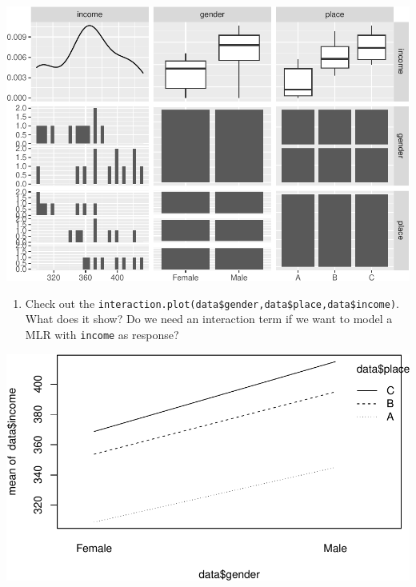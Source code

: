 \documentclass[
]{article}
\newenvironment{Shaded}{\begin{snugshade}}{\end{snugshade}}
\newcommand{\AttributeTok}[1]{\textcolor[rgb]{0.13,0.29,0.53}{#1}}
\newcommand{\FunctionTok}[1]{\textcolor[rgb]{0.13,0.29,0.53}{\textbf{#1}}}
\newcommand{\NormalTok}[1]{#1}
\newcommand{\SpecialCharTok}[1]{\textcolor[rgb]{0.81,0.36,0.00}{\textbf{#1}}}
\newcommand{\StringTok}[1]{\textcolor[rgb]{0.31,0.60,0.02}{#1}}
\providecommand{\tightlist}{%
  \setlength{\itemsep}{0pt}\setlength{\parskip}{0pt}}
\begin{document}
\includegraphics{2MLR_files/figure-latex/unnamed-chunk-29-1.pdf}

\begin{enumerate}
\def\labelenumi{\arabic{enumi}.}
\setcounter{enumi}{1}
\tightlist
\item
  Check out the
  \texttt{interaction.plot(data\$gender,data\$place,data\$income)}. What
  does it show? Do we need an interaction term if we want to model a MLR
  with \texttt{income} as response?
\end{enumerate}

\begin{Shaded}
\end{Shaded}

\includegraphics{2MLR_files/figure-latex/unnamed-chunk-30-1.pdf}
\end{document}
